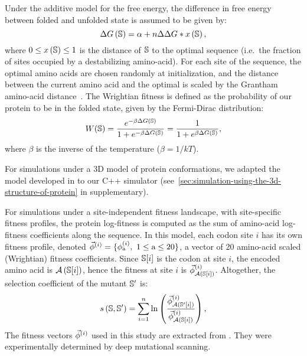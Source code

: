 Under the additive model for the free energy, the difference in free energy between folded and unfolded state is assumed to be given by:
\begin{equation*}
    \Delta G\left(\mathbb{S}\right) = \alpha + n \Delta \Delta G * x\left(\mathbb{S}\right),
\end{equation*}
where $0 \leq x\left(\mathbb{S}\right) \leq 1$ is the distance of $\mathbb{S}$ to the optimal sequence (i.e.~the fraction of sites occupied by a destabilizing amino-acid).
For each site of the sequence, the optimal amino acids are chosen randomly at initialization, and the distance between the current amino acid and the optimal is scaled by the Grantham amino-acid distance~\citep{Grantham1974}.
The Wrightian fitness is defined as the probability of our protein to be in the folded state, given by the Fermi-Dirac distribution:
\begin{equation}
    W (\mathbb{S}) = \dfrac{e^{-\beta \Delta G\left(\mathbb{S}\right) }}{1 + e^{-\beta \Delta G\left(\mathbb{S}\right) }} = \dfrac{1}{1 + e^{\beta \Delta G\left(\mathbb{S}\right) }},
\end{equation}
where $\beta$ is the inverse of the temperature ($\beta=1/kT$).

For simulations under a 3D model of protein conformations, we adapted the model developed in \citet{Goldstein2017} to our C++ simulator (see~\ref{sec:simulation-using-the-3d-structure-of-protein} in supplementary).

For simulations under a site-independent fitness landscape, with site-specific fitness profiles, the protein log-fitness is computed as the sum of amino-acid log-fitness coefficients along the sequence.
In this model, each \gls{codon} site $i$ has its own fitness profile, denoted $\vec{\phi}^{(i)} = \{ \phi^{(i)}_{\text{a}},\ 1 \leq \text{a} \leq 20 \}$, a vector of 20 amino-acid scaled (Wrightian) fitness coefficients.
Since $\mathbb{S}[ i ]$ is the \gls{codon} at site $i$, the encoded amino acid is $\mathcal{A} \left( \mathbb{S}[ i ] \right)$, hence the fitness at site $i$ is $\vec{\phi}^{(i)}_{\mathcal{A} \left( \mathbb{S}[ i ] \right)}$.
Altogether, the selection coefficient of the mutant $\mathbb{S}'$ is:
\begin{equation}
    s \left( \mathbb{S},\mathbb{S}'\right) = \sum\limits_{ i = 1 }^{n} \ln \left( \dfrac{\vec{\phi}^{(i)}_{\mathcal{A} \left( \mathbb{S}'[ i ] \right)}}{\vec{\phi}^{(i)}_{\mathcal{A} \left( \mathbb{S}[ i ] \right)}} \right),
\end{equation}
The fitness vectors $\vec{\phi}^{(i)}$ used in this study are extracted from \citet{Bloom2017}.
They were experimentally determined by deep mutational scanning.

